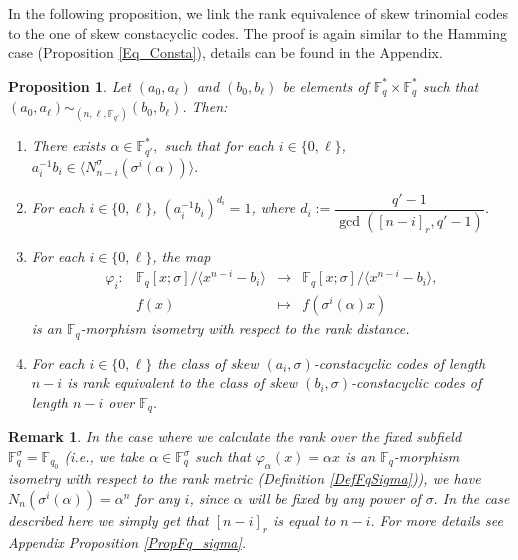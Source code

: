 \documentclass[12pt,paper]{article}
\theoremstyle{plain}
\newtheorem{proposition}[theorem]{Proposition}
\newtheorem{remark}[theorem]{Remark}
\newcommand{\Fq}{\mathbb{F}_{q}}
\begin{document}
In the following proposition, we link the rank equivalence of skew trinomial codes to the one of skew constacyclic codes. The proof is again similar to the Hamming case (Proposition \ref{Eq_Consta}), details can be found in the Appendix.
\begin{proposition}\label{RankEquiv_Consta}
Let $ (a_0, a_{\ell}) $ and $ (b_0, b_{\ell}) $ be elements of $ \Fq^{*} \times \Fq^{*} $ such that $ (a_0, a_{\ell}) \sim_{(n, \ell, \mathbb{F}_{q'})} (b_0, b_{\ell}) $. Then:
\begin{enumerate}
    \item There exists $\alpha\in  \mathbb{F}_{q'}^{*} ,$ such that for each $ i \in \{0, \ell\} $, $ a_i^{-1} b_i \in
    \langle N_{n-i}^{\sigma}(\sigma^i(\alpha)) \rangle.$
    \item For each $ i \in \{0, \ell\} $, $ (a_i^{-1} b_i)^{d_i} = 1 $, where $ d_i := \dfrac{q'-1}{\gcd([n-i]_r, q'-1)} $.
    \item For each $ i \in \{0, \ell\} $, the map 
    \begin{equation*}
  	\begin{array}{cccc}
  	\varphi_{i}:& \mathbb{F}_q[x;\sigma] /\langle x^{n-i}-b_i\rangle  &\longrightarrow & \mathbb{F}_q[x;\sigma] /\langle
    x^{n-i}-b_i\rangle, \\ 
  	& f(x)& \longmapsto &  f(\sigma^i(\alpha) x)  
  	\end{array}
  	\end{equation*} 
is an $\mathbb{F}_q$-morphism isometry  with respect to the rank  distance.
    \item For each $ i \in \{0, \ell\} $ the class of skew  $(a_i,\sigma)$-constacyclic codes of length $n-i$ is { rank equivalent} to the class of skew   $(b_i,\sigma)$-constacyclic codes of length $n-i$  over $\Fq.$ 
\end{enumerate}
\end{proposition}
  
  
 


 
\begin{remark}\label{ConstacyclicFq_sigma}
In the case where we calculate the rank over the fixed subfield $ \mathbb{F}_q^{\sigma} = \mathbb{F}_{q_0}$ (i.e., we take $\alpha \in \Fq^{\sigma}$ such that $ \varphi_{\alpha}(x)= \alpha x$ is an $\Fq$-morphism isometry with respect to the rank metric (Definition \ref{DefFqSigma})), we have $ N_n(\sigma^i(\alpha))= \alpha^n$ for any $i$, since $ \alpha$ will be fixed by any power of $\sigma.$ In the case described here we simply get that $[n-i]_r$ is equal to $n-i.$ For more details see Appendix Proposition \ref{PropFq_sigma}.  
\end{remark}
\end{document}
